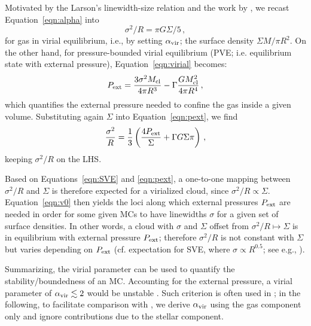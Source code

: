 \IfFileExists{emulateapjlegacy.cls}{\documentclass[iop]{emulateapjlegacy}}{\documentclass[iop]{emulateapj}}
\begin{document}
Motivated by the Larson's linewidth-size relation \citep{Larson81a} and the work by \citet{Heyer09a}, we recast Equation~\ref{eqn:alpha} into 
\begin{equation}
\sigma^2/R = \pi G \Sigma/5\,,
\label{eqn:SVE}
\end{equation}
for gas in virial equilibrium, i.e., by setting $\alpha_{\rm vir}$; the surface density $\Sigma$\eq$M/\pi R^2$. On the other hand, for pressure-bounded virial equilibrium (PVE; i.e. equilibrium state with external pressure), Equation~\ref{eqn:virial} becomes:
\begin{equation}
P_{\rm ext} = \frac{3\sigma^2M_{\rm cl}}{4\pi R^3} - \Gamma\frac{G M_{\rm cl}^2}{4\pi R^4}\,,
\label{eqn:pext}
\end{equation}
which quantifies the external pressure needed to confine the gas inside a given volume. Substituting again $\Sigma$  into Equation~\ref{eqn:pext}, we find 
\begin{equation}
\frac{\sigma^2}{R} = \frac{1}{3}\left(\frac{4P_{\rm ext}}{\Sigma} + \Gamma G \Sigma \pi \right)\,,
\label{eqn:v0}
\end{equation}
keeping $\sigma^2/R$ on the LHS.

Based on Equations~\ref{eqn:SVE} and \ref{eqn:pext}, a one-to-one mapping between $\sigma^2/R$ and $\Sigma$ is therefore expected for a virialized cloud, since $\sigma^2/R\propto\Sigma$. Equation~\ref{eqn:v0} then yields the loci along which external pressures $P_{\rm ext}$ are needed in order for some given MCs to have linewidths $\sigma$ for a given set of surface densities. In other words, a cloud with $\sigma$ and $\Sigma$ offset from $\sigma^2/R\mapsto\Sigma$ is in equilibrium with external pressure $P_{\rm ext}$; therefore $\sigma^2/R$ is not constant with $\Sigma$ but varies depending on $P_{\rm ext}$ (cf. expectation for SVE, where $\sigma\propto R^{0.5}$; see e.g., \citealt{Heyer09a, Hughes10a, Hughes13b, Meidt13a}).

Summarizing, the virial parameter can be used to quantify the stability/boundedness of an MC. Accounting for the external pressure, a virial parameter of $\alpha_{\rm vir}\lesssim2$ would be unstable \citep{bertoldi:1992}.
%
Such criterion is often used in \obs \citep[see e.g., ][]{Kauffmann17b}; in the following, to facilitate comparison with \obs, we derive $\alpha_{\rm vir}$ using the gas component only and ignore contributions due to the stellar component.

\end{document}
